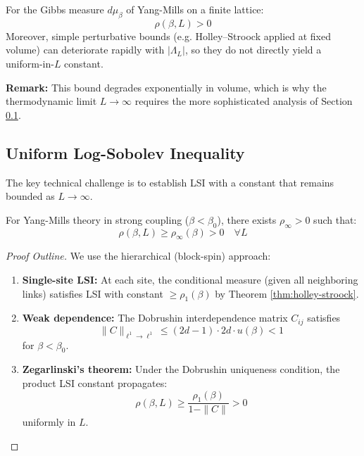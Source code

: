 \begin{corollary}\label{cor:ym-lsi}
For the Gibbs measure $d\mu_\beta$ of Yang-Mills on a finite lattice:
\begin{equation}
    \rho(\beta, L) > 0
\end{equation}
Moreover, simple perturbative bounds (e.g. Holley--Stroock applied at fixed volume) can deteriorate rapidly with $|\Lambda_L|$, so they do not directly yield a uniform-in-$L$ constant.
\end{corollary}

\textbf{Remark:} This bound degrades exponentially in volume, which is why the thermodynamic limit $L \to \infty$ requires the more sophisticated analysis of Section \ref{sec:uniform-lsi}.

\subsection{Uniform Log-Sobolev Inequality}
\label{sec:uniform-lsi}

The key technical challenge is to establish LSI with a constant that remains bounded as $L \to \infty$.

\begin{theorem}\label{thm:zegarlinski}
For Yang-Mills theory in strong coupling ($\beta < \beta_0$), there exists $\rho_\infty > 0$ such that:
\begin{equation}
    \rho(\beta, L) \geq \rho_\infty(\beta) > 0 \quad \forall L
\end{equation}
\end{theorem}

\begin{proof}[Proof Outline]
We use the hierarchical (block-spin) approach:
\begin{enumerate}
    \item \textbf{Single-site LSI:} At each site, the conditional measure (given all neighboring links) satisfies LSI with constant $\geq \rho_1(\beta)$ by Theorem \ref{thm:holley-stroock}.
    
    \item \textbf{Weak dependence:} The Dobrushin interdependence matrix $C_{ij}$ satisfies
    \begin{equation}
        \|C\|_{\ell^1 \to \ell^1} \leq (2d-1) \cdot 2d \cdot u(\beta) < 1
    \end{equation}
    for $\beta < \beta_0$.
    
    \item \textbf{Zegarlinski's theorem:} Under the Dobrushin uniqueness condition, the product LSI constant propagates:
    \begin{equation}
        \rho(\beta, L) \geq \frac{\rho_1(\beta)}{1 - \|C\|} > 0
    \end{equation}
    uniformly in $L$.
\end{enumerate}
\end{proof}

